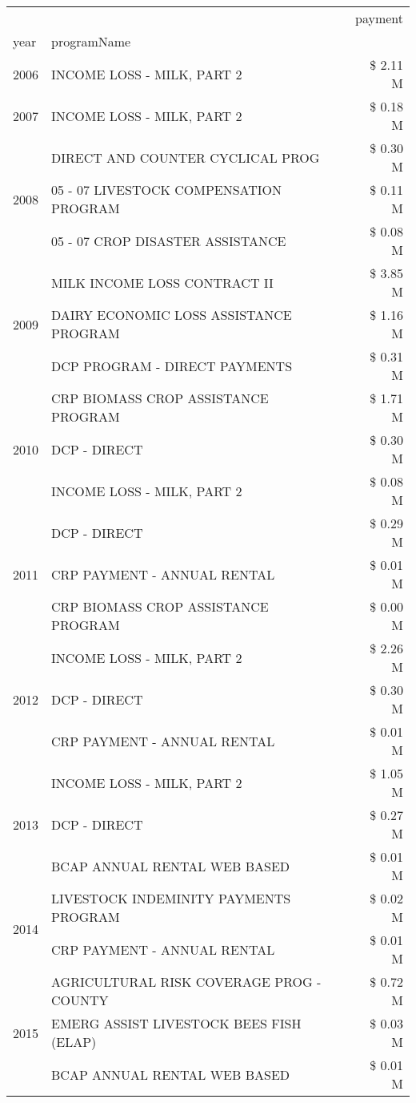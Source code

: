 \begin{tabular}{llr}
\toprule
 &  & payment \\
year & programName &  \\
\midrule
2006 & INCOME LOSS - MILK, PART 2 & \$ 2.11 M \\
\cline{1-3}
2007 & INCOME LOSS - MILK, PART 2 & \$ 0.18 M \\
\cline{1-3}
\multirow[t]{3}{*}{2008} & DIRECT AND COUNTER CYCLICAL PROG & \$ 0.30 M \\
 & 05 - 07 LIVESTOCK COMPENSATION PROGRAM & \$ 0.11 M \\
 & 05 - 07 CROP DISASTER ASSISTANCE & \$ 0.08 M \\
\cline{1-3}
\multirow[t]{3}{*}{2009} & MILK INCOME LOSS CONTRACT II & \$ 3.85 M \\
 & DAIRY ECONOMIC LOSS ASSISTANCE PROGRAM & \$ 1.16 M \\
 & DCP PROGRAM - DIRECT PAYMENTS & \$ 0.31 M \\
\cline{1-3}
\multirow[t]{3}{*}{2010} & CRP BIOMASS CROP ASSISTANCE PROGRAM & \$ 1.71 M \\
 & DCP - DIRECT & \$ 0.30 M \\
 & INCOME LOSS - MILK, PART 2 & \$ 0.08 M \\
\cline{1-3}
\multirow[t]{3}{*}{2011} & DCP - DIRECT & \$ 0.29 M \\
 & CRP PAYMENT - ANNUAL RENTAL & \$ 0.01 M \\
 & CRP BIOMASS CROP ASSISTANCE PROGRAM & \$ 0.00 M \\
\cline{1-3}
\multirow[t]{3}{*}{2012} & INCOME LOSS - MILK, PART 2 & \$ 2.26 M \\
 & DCP - DIRECT & \$ 0.30 M \\
 & CRP PAYMENT - ANNUAL RENTAL & \$ 0.01 M \\
\cline{1-3}
\multirow[t]{3}{*}{2013} & INCOME LOSS - MILK, PART 2 & \$ 1.05 M \\
 & DCP - DIRECT & \$ 0.27 M \\
 & BCAP ANNUAL RENTAL WEB BASED & \$ 0.01 M \\
\cline{1-3}
\multirow[t]{2}{*}{2014} & LIVESTOCK INDEMINITY PAYMENTS PROGRAM & \$ 0.02 M \\
 & CRP PAYMENT - ANNUAL RENTAL & \$ 0.01 M \\
\cline{1-3}
\multirow[t]{3}{*}{2015} & AGRICULTURAL RISK COVERAGE PROG - COUNTY & \$ 0.72 M \\
 & EMERG ASSIST LIVESTOCK BEES FISH (ELAP) & \$ 0.03 M \\
 & BCAP ANNUAL RENTAL WEB BASED & \$ 0.01 M \\

\end{tabular}
